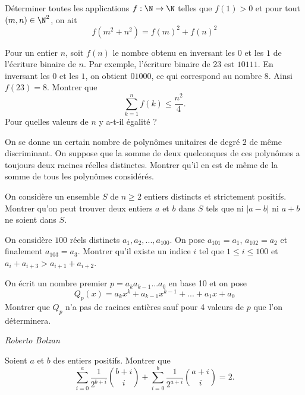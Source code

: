 \begin{exo}{}
Déterminer toutes les applications $f : \N \rightarrow \N$ telles que $f(1)>0$ et pour tout $(m,n) \in \N^{2}$, on ait
\[f(m^2+n^2) = f(m)^2+f(n)^2\]
\end{exo}

\begin{exo}{}
Pour un entier $n$, soit $f(n)$ le nombre obtenu en inversant les $0$ et les $1$ de l'écriture binaire de $n$. Par exemple, l'écriture binaire de $23$ est $10111$. En inversant les $0$ et les $1$, on obtient $01000$, ce qui correspond au nombre $8$. Ainsi $f(23)=8$. Montrer que
\[\sum_{k=1}^n f(k) \leq \frac{n^2}{4}.\]
Pour quelles valeurs de $n$ y a-t-il égalité ?
\end{exo}


\begin{exo}{}
On se donne un certain nombre de polynômes unitaires de degré $2$ de même discriminant. On suppose que la somme de deux quelconques de ces polynômes a toujours deux racines réelles distinctes. Montrer qu'il en est de même de la somme de tous les polynômes considérés.
\end{exo}


\begin{exo}{}
On considère un ensemble $S$ de $n\ge 2$ entiers distincts et strictement positifs. Montrer qu'on peut trouver deux entiers $a$ et $b$ dans $S$ tels que ni $|a-b|$ ni $a+b$ ne soient dans $S$.
 \end{exo}

\begin{exo}{}
On considère $100$ réels distincts $a_1,a_2,...,a_{100}$. On pose $a_{101}=a_1$, $a_{102}=a_2$ et finalement $a_{103}=a_3$. Montrer qu'il existe un indice $i$ tel que $1\le i \le 100$ et  $a_{i}+a_{i+3}>a_{i+1}+a_{i+2}$.
\end{exo}
\begin{exo}{}
On écrit un nombre premier $p=a_ka_{k-1}...a_0$ en base 10 et on pose
\[Q_p(x)=a_kx^k+a_{k-1}x^{k-1}+...+a_1x+a_0\]
Montrer que $Q_p$ n'a pas de racines entières sauf pour 4 valeurs de $p$ que l'on déterminera.

\medskip
\textit{Roberto Bolzan}
\end{exo}

%
\begin{exo}{}
Soient $a$ et $b$ des entiers positifs. Montrer que
$$\displaystyle \sum_{i=0}^{a} \frac{1}{2^{b+i}} \binom{b+i}{i} + \displaystyle\sum_{i=0}^{b} \frac{1}{2^{a+i}} \binom{a+i}{i} = 2.$$
\end{exo}


